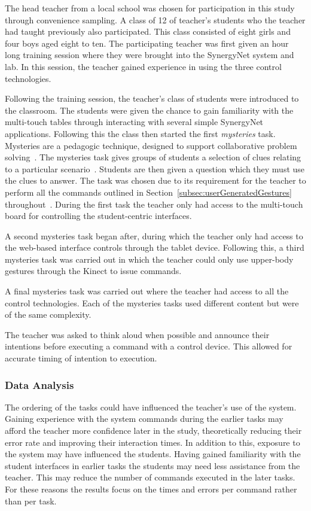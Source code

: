 \documentclass[link]{IWCOMP}
\begin{document}
The head teacher from a local school was chosen for participation in this study through convenience sampling.
A class of 12 of teacher's students who the teacher had taught previously also participated.
This class consisted of eight girls and four boys aged eight to ten.
The participating teacher was first given an hour long training session where they were brought into the SynergyNet system and lab.  
In this session, the teacher gained experience in using the three control technologies.

Following the training session, the teacher's class of students were introduced to the classroom.
The students were given the chance to gain familiarity with the multi-touch tables through interacting with several simple SynergyNet applications.
Following this the class then started the first \textit{mysteries} task.
Mysteries are a pedagogic technique, designed to support collaborative problem solving~\cite{Leat2002}.
The mysteries task gives groups of students a selection of clues relating to a particular scenario~\cite{Higgins2011b}.
Students are then given a question which they must use the clues to answer.
The task was chosen due to its requirement for the teacher to perform all the commands outlined in Section~\ref{subsec:userGeneratedGestures} throughout~\cite{Mercier2012}.
During the first task the teacher only had access to the multi-touch board for controlling the student-centric interfaces.

A second mysteries task began after, during which the teacher only had access to the web-based interface controls through the tablet device.
Following this, a third mysteries task was carried out in which the teacher could only use upper-body gestures through the Kinect to issue commands.

A final mysteries task was carried out where the teacher had access to all the control technologies.  
Each of the mysteries tasks used different content but were of the same complexity.  

The teacher was asked to think aloud when possible and announce their intentions before executing a command with a control device.  
This allowed for accurate timing of intention to execution.

\subsubsection{Data Analysis}
\label{subsubsec:pilotStudyAnalysis}

The ordering of the tasks could have influenced the teacher's use of the system.
Gaining experience with the system commands during the earlier tasks may afford the teacher more confidence later in the study, theoretically reducing their error rate and improving their interaction times.
In addition to this, exposure to the system may have influenced the students.
Having gained familiarity with the student interfaces in earlier tasks the students may need less assistance from the teacher.
This may reduce the number of commands executed in the later tasks.
For these reasons the results focus on the times and errors per command rather than per task.
\end{document}
